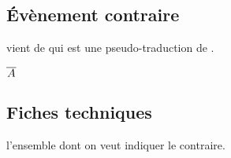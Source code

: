 \documentclass[12pt,a4paper]{article}
\begin{document}

\subsection{Évènement contraire}

 vient de   qui est une pseudo-traduction de .
\begin{latexex}
$\nevent{A}$
\end{latexex}




\subsection{Fiches techniques}


\IDarg{} l'ensemble dont on veut indiquer le contraire.
\end{document}
